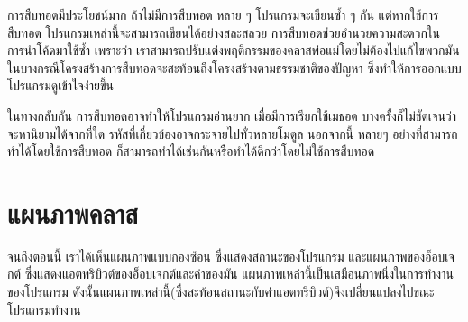 
การสืบทอดมีประโยชน์มาก 
ถ้าไม่มีการสืบทอด หลาย ๆ โปรแกรมจะเขียนซ้ำ ๆ กัน
แต่หากใช้การสืบทอด โปรแกรมเหล่านี้จะสามารถเขียนได้อย่างสละสลวย
การสืบทอดช่วยอำนวยความสะดวกในการนำโค้ดมาใช้ซ้ำ 
เพราะว่า เราสามารถปรับแต่งพฤติกรรมของคลาสพ่อแม่โดยไม่ต้องไปแก้ไขพวกมัน ในบางกรณีโครงสร้างการสืบทอดจะสะท้อนถึงโครงสร้างตามธรรมชาติของปัญหา 
ซึ่งทำให้การออกแบบโปรแกรมดูเข้าใจง่ายขึ้น



ในทางกลับกัน การสืบทอดอาจทำให้โปรแกรมอ่านยาก เมื่อมีการเรียกใช้เมธอด บางครั้งก็ไม่ชัดเจนว่าจะหานิยามได้จากที่ใด 
รหัสที่เกี่ยวข้องอาจกระจายไปทั่วหลายโมดูล นอกจากนี้ หลายๆ อย่างที่สามารถทำได้โดยใช้การสืบทอด ก็สามารถทำได้เช่นกันหรือทำได้ดีกว่าโดยไม่ใช้การสืบทอด


\section{แผนภาพคลาส} %
\label{class.diagram}


จนถึงตอนนี้ เราได้เห็นแผนภาพแบบกองซ้อน ซึ่งแสดงสถานะของโปรแกรม และแผนภาพของอ็อบเจกต์ ซึ่งแสดงแอตทริบิวต์ของอ็อบเจกต์และค่าของมัน 
แผนภาพเหล่านี้เป็นเสมือนภาพนิ่งในการทำงานของโปรแกรม 
ดังนั้นแผนภาพเหล่านี้(ซึ่งสะท้อนสถานะกับค่าแอตทริบิวต์)จึงเปลี่ยนแปลงไปขณะโปรแกรมทำงาน




